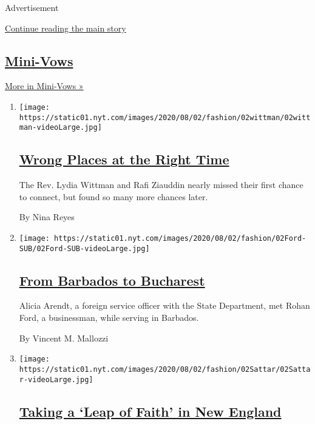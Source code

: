 Advertisement

\protect\hyperlink{after-mid1}{Continue reading the main story}

\hypertarget{mini-vows}{%
\subsection{\texorpdfstring{\href{/column/mini-vows}{Mini-Vows}}{Mini-Vows}}\label{mini-vows}}

\href{/column/mini-vows}{More in Mini-Vows »}

\begin{enumerate}
\def\labelenumi{\arabic{enumi}.}
\item
  \texttt{[image: https://static01.nyt.com/images/2020/08/02/fashion/02wittman/02wittman-videoLarge.jpg]}

  \hypertarget{wrong-places-at-the-right-time}{%
  \subsection{\texorpdfstring{\href{/2020/07/31/fashion/weddings/wrong-places-at-the-right-time.html}{Wrong
  Places at the Right
  Time}}{Wrong Places at the Right Time}}\label{wrong-places-at-the-right-time}}

  The Rev. Lydia Wittman and Rafi Ziauddin nearly missed their first
  chance to connect, but found so many more chances later.

  By Nina Reyes
\item
  \texttt{[image: https://static01.nyt.com/images/2020/08/02/fashion/02Ford-SUB/02Ford-SUB-videoLarge.jpg]}

  \hypertarget{from-barbados-to-bucharest}{%
  \subsection{\texorpdfstring{\href{/2020/07/31/fashion/weddings/from-barbados-to-bucharest.html}{From
  Barbados to
  Bucharest}}{From Barbados to Bucharest}}\label{from-barbados-to-bucharest}}

  Alicia Arendt, a foreign service officer with the State Department,
  met Rohan Ford, a businessman, while serving in Barbados.

  By Vincent M. Mallozzi
\item
  \texttt{[image: https://static01.nyt.com/images/2020/08/02/fashion/02Sattar/02Sattar-videoLarge.jpg]}

  \hypertarget{taking-a-leap-of-faith-in-new-england}{%
  \subsection{\texorpdfstring{\href{/2020/07/31/fashion/weddings/taking-a-leap-of-faith-in-new-england.html}{Taking
  a `Leap of Faith' in New
  England}}{Taking a `Leap of Faith' in New England}}\label{taking-a-leap-of-faith-in-new-england}}


\end{enumerate}
